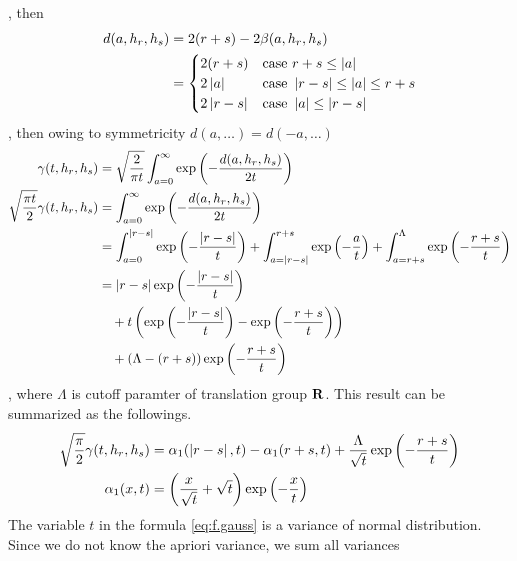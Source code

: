 , then
\begin{equation}\begin{split}
	d(a,h_r,h_s) &= 2(r+s) - 2\beta(a,h_r,h_s) \\
		&= \begin{cases}
			2(r+s) & \text{case } r+s\le\left|{a}\right| \\
			2\left|{a}\right| & \text{case } \left|{r-s}\right|\le\left|{a}\right|\le r+s \\
			2\left|{r-s}\right| & \text{case } \left|{a}\right|\le\left|{r-s}\right| \\
			\end{cases}
\end{split}\end{equation}
, then owing to symmetricity $d(a,\dots)=d(-a,\dots)$
\begin{equation}\begin{split}
	\gamma(t,h_r,h_s) 
		&= \sqrt{\frac{2}{\pi t}}\int_{a=0}^{\infty}\exp\left({-\frac{d(a,h_r,h_s)}{2t}}\right) \\ 
	\sqrt{\frac{\pi t}{2}}\gamma(t,h_r,h_s) 
		&= \int_{a=0}^{\infty}\exp\left({-\frac{d(a,h_r,h_s)}{2t}}\right) \\ 
		&= \int_{a=0}^{\left|{r-s}\right|}\exp\left({-\frac{\left|{r-s}\right|}{t}}\right)
			+ \int_{a=\left|{r-s}\right|}^{r+s}\exp\left({-\frac{a}{t}}\right)
			+ \int_{a=r+s}^{\Lambda} \exp\left({-\frac{r+s}{t}}\right) \\
		&= \left|{r-s}\right|\exp\left({-\frac{\left|{r-s}\right|}{t}}\right) \\
			&\quad + t\left({\exp\left({-\frac{\left|{r-s}\right|}{t}}\right) - \exp\left({-\frac{r+s}{t}}\right)}\right) \\
			&\quad + \left({\Lambda - \left({r+s}\right)}\right) \exp\left({-\frac{r+s}{t}}\right) \\
\end{split}\end{equation}
, where $\Lambda$ is cutoff paramter of translation group ${\mathbf{R}}$.
This result can be summarized as the followings.
\begin{equation}\begin{split}
	\sqrt{\frac{\pi}{2}}\gamma(t,h_r,h_s) 
		&= \alpha_1(\left|{r-s}\right|, t) - \alpha_1(r+s, t) + \frac{\Lambda}{\sqrt{t}}\exp\left({-\frac{r+s}{t}}\right) \\
	\alpha_1(x, t) &= \left({\frac{x}{\sqrt{t}} + \sqrt{t}}\right)\exp\left({-\frac{x}{t}}\right) \\
\end{split}\end{equation}
The variable $t$ in the formula \eqref{eq:f.gauss}  is a variance of normal
distribution. Since we do not know the apriori variance, we sum all variances
